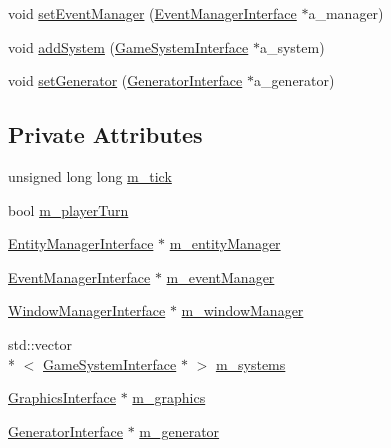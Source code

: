 \begin{DoxyCompactItemize}
\item 
void \hyperlink{classGameEngine_a106e8e5d663134be9269b1a94b166c4a}{set\-Event\-Manager} (\hyperlink{classEventManagerInterface}{Event\-Manager\-Interface} $\ast$a\-\_\-manager)
\item 
void \hyperlink{classGameEngine_a58c80c2beb150f2816112371476aee12}{add\-System} (\hyperlink{classGameSystemInterface}{Game\-System\-Interface} $\ast$a\-\_\-system)
\item 
void \hyperlink{classGameEngine_a35bcdcd4574b2b1148fcff5a46a9277d}{set\-Generator} (\hyperlink{classGeneratorInterface}{Generator\-Interface} $\ast$a\-\_\-generator)
\end{DoxyCompactItemize}
\subsection*{Private Attributes}
\begin{DoxyCompactItemize}
\item 
unsigned long long \hyperlink{classGameEngine_ae50a77cf15fb12d6bb3e70ea64d4e652}{m\-\_\-tick}
\item 
bool \hyperlink{classGameEngine_af947cd69a795991a32716391175f61bc}{m\-\_\-player\-Turn}
\item 
\hyperlink{classEntityManagerInterface}{Entity\-Manager\-Interface} $\ast$ \hyperlink{classGameEngine_a3bf658348acbe7dafc657dc9c5442102}{m\-\_\-entity\-Manager}
\item 
\hyperlink{classEventManagerInterface}{Event\-Manager\-Interface} $\ast$ \hyperlink{classGameEngine_ab6c16baef2f287aef03cb336c831cdf6}{m\-\_\-event\-Manager}
\item 
\hyperlink{classWindowManagerInterface}{Window\-Manager\-Interface} $\ast$ \hyperlink{classGameEngine_a3308c8793731727773dbbd4614e06db6}{m\-\_\-window\-Manager}
\item 
std\-::vector\\*
$<$ \hyperlink{classGameSystemInterface}{Game\-System\-Interface} $\ast$ $>$ \hyperlink{classGameEngine_acc3e703e0019b3a5920a2d01339ccd68}{m\-\_\-systems}
\item 
\hyperlink{classGraphicsInterface}{Graphics\-Interface} $\ast$ \hyperlink{classGameEngine_a622586460faf2b46676aee1918d6a7eb}{m\-\_\-graphics}
\item 
\hyperlink{classGeneratorInterface}{Generator\-Interface} $\ast$ \hyperlink{classGameEngine_a8ce4a186b42c05555660321ae72efe9c}{m\-\_\-generator}
\end{DoxyCompactItemize}


